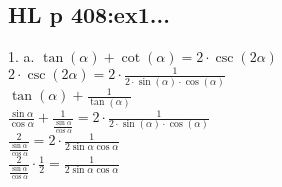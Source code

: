 \documentclass{article}
\begin{document}
  \subsection{HL p 408:ex1...}
  1. a. $\tan(\alpha)+\cot(\alpha)=2\cdot\csc(2\alpha)$\\
  $2\cdot\csc(2\alpha)=2\cdot\frac{1}{2\cdot\sin(\alpha)\cdot\cos(\alpha)}$\\
  $\tan(\alpha)+\frac{1}{\tan(\alpha)}$\\
  $\frac{\sin\alpha}{\cos\alpha}+\frac{1}{\frac{\sin\alpha}{\cos\alpha}}=2\cdot\frac{1}{2\cdot\sin(\alpha)\cdot\cos(\alpha)}$\\
  $\frac{2}{\frac{\sin\alpha}{\cos\alpha}}=2\cdot\frac{1}{2\sin\alpha\cos\alpha}$\\
  $\frac{2}{\frac{\sin\alpha}{\cos\alpha}}\cdot\frac{1}{2}=\frac{1}{2\sin\alpha\cos\alpha}$\\

   
   
\end{document}

